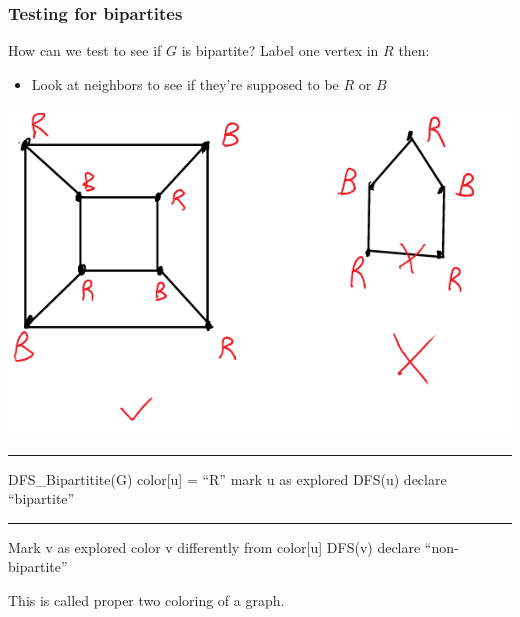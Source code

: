 \documentclass[11pt]{article}
\begin{document}
\subsubsection{Testing for bipartites}
\label{sec:orgf7877c2}
How can we test to see if \(G\) is bipartite? Label one vertex in \(R\) then:
\begin{itemize}
\item Look at neighbors to see if they're supposed to be \(R\) or \(B\)
\end{itemize}
\begin{center}
\includegraphics[width=.9\linewidth]{./Images/i20.png}
\end{center}

\noindent\rule{\textwidth}{0.5pt}
\begin{algorithmic}
  \State DFS\_Bipartitite(G)
                \State color[u] = ``R''
                \State mark u as explored
                \State DFS(u)
        \EndIf
 \EndFor
        \State declare ``bipartite''
\EndIf
      \end{algorithmic}

\noindent\rule{\textwidth}{0.5pt}
\begin{algorithmic}
  \State Mark v as explored
  \State color v differently from color[u]
  \State DFS(v)
  \State declare ``non-bipartite''
  \EndIf
  \EndFor
\end{algorithmic}
This is called proper two coloring of a graph.
\end{document}
